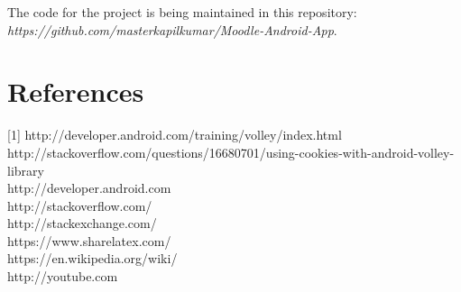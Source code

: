\documentclass[12pt]{article}
\begin{document}
The code for the project is being maintained in this repository: {\em https://github.com/masterkapilkumar/Moodle-Android-App}.


\section{References}
[1] http://developer.android.com/training/volley/index.html \\
http://stackoverflow.com/questions/16680701/using-cookies-with-android-volley-library \\
http://developer.android.com \\
http://stackoverflow.com/ \\
http://stackexchange.com/ \\
https://www.sharelatex.com/ \\
https://en.wikipedia.org/wiki/ \\
http://youtube.com
\end{document}
